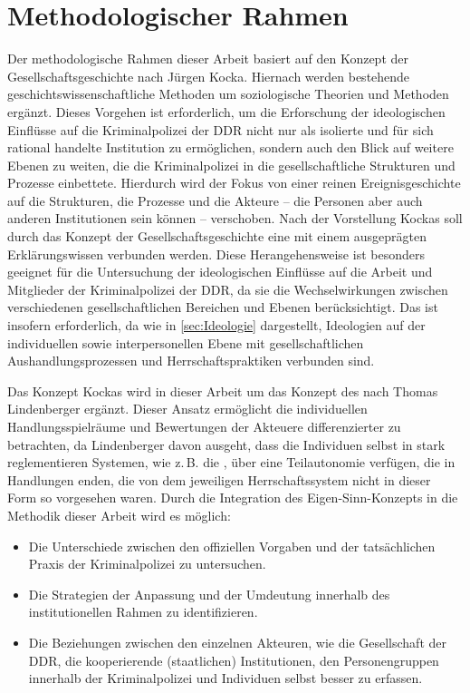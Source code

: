 \section{Methodologischer Rahmen}
Der methodologische Rahmen dieser Arbeit basiert auf den Konzept der Gesellschaftsgeschichte nach Jürgen Kocka. %
Hiernach werden bestehende geschichtswissenschaftliche Methoden um soziologische Theorien und Methoden ergänzt.
Dieses Vorgehen ist erforderlich, um die Erforschung der ideologischen Einflüsse auf die Kriminalpolizei der DDR nicht nur als isolierte und für sich rational handelte Institution zu ermöglichen, sondern auch den Blick auf weitere Ebenen zu weiten, die die Kriminalpolizei in die gesellschaftliche Strukturen und Prozesse einbettete. 
Hierdurch wird der Fokus von einer reinen Ereignisgeschichte auf die Strukturen, die Prozesse und die Akteure -- die Personen aber auch anderen Institutionen sein können -- verschoben. 
Nach der Vorstellung Kockas soll durch das Konzept der Gesellschaftsgeschichte eine  mit einem ausgeprägten Erklärungswissen %
verbunden werden. %
Diese Herangehensweise ist besonders geeignet für die Untersuchung der ideologischen Einflüsse auf die Arbeit und Mitglieder der Kriminalpolizei der DDR, da sie die Wechselwirkungen zwischen verschiedenen gesellschaftlichen Bereichen und Ebenen berücksichtigt.
Das ist insofern erforderlich, da wie in \cref{sec:Ideologie} dargestellt, Ideologien auf der individuellen sowie interpersonellen Ebene mit gesellschaftlichen Aushandlungsprozessen und Herrschaftspraktiken\autocite[siehe hierzu][21-23]{Lindenberger1999} %
verbunden sind. %
\par Das Konzept Kockas wird in dieser Arbeit um das Konzept des \autocite{Lindenberger1999} nach Thomas Lindenberger ergänzt.
Dieser Ansatz ermöglicht die individuellen Handlungsspielräume und Bewertungen der Akteuere differenzierter zu betrachten, da Lindenberger davon ausgeht, dass die Individuen selbst in stark reglementieren Systemen, wie z.\,B. die  , über eine Teilautonomie verfügen, die in Handlungen enden, die von dem jeweiligen Herrschaftssystem nicht in dieser Form so vorgesehen waren.\autocite[24]{Lindenberger1999}
Durch die Integration des Eigen-Sinn-Konzepts in die Methodik dieser Arbeit wird es möglich:
\begin{itemize}
  \item Die Unterschiede zwischen den offiziellen Vorgaben und der tatsächlichen Praxis der Kriminalpolizei zu untersuchen.
  \item Die Strategien der Anpassung und der Umdeutung innerhalb des institutionellen Rahmen zu identifizieren.
  \item Die Beziehungen zwischen den einzelnen Akteuren, wie die Gesellschaft der DDR, die kooperierende (staatlichen) Institutionen, den Personengruppen innerhalb der Kriminalpolizei und Individuen selbst besser zu erfassen.
\end{itemize}
